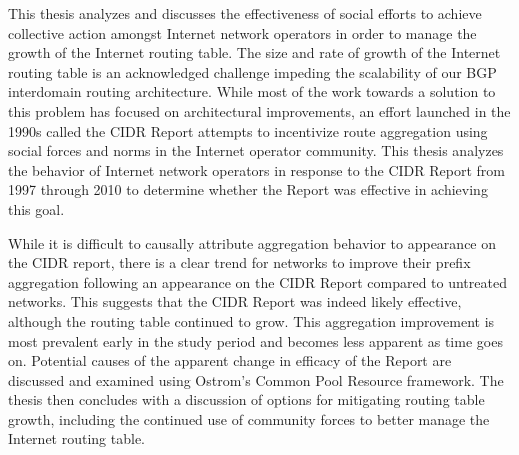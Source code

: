 %
%
%
This thesis analyzes and discusses the effectiveness of social efforts to achieve collective action amongst Internet network operators in order to manage the growth of the Internet routing table. The size and rate of growth of the Internet routing table is an acknowledged challenge impeding the scalability of our BGP interdomain routing architecture. While most of the work towards a solution to this problem has focused on architectural improvements, an effort launched in the 1990s called the CIDR Report attempts to incentivize route aggregation using social forces and norms in the Internet operator community. This thesis analyzes the behavior of Internet network operators in response to the CIDR Report from 1997 through 2010 to determine whether the Report was effective in achieving this goal.

While it is difficult to causally attribute aggregation behavior to appearance on the CIDR report, there is a clear trend for networks to improve their prefix aggregation following an appearance on the CIDR Report compared to untreated networks. This suggests that the CIDR Report was indeed likely effective, although the routing table continued to grow. This aggregation improvement is most prevalent early in the study period and becomes less apparent as time goes on. Potential causes of the apparent change in efficacy of the Report are discussed and examined using Ostrom's Common Pool Resource framework. The thesis then concludes with a discussion of options for mitigating routing table growth, including the continued use of community forces to better manage the Internet routing table.